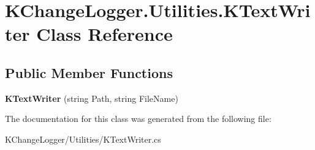 \hypertarget{class_k_change_logger_1_1_utilities_1_1_k_text_writer}{\section{K\-Change\-Logger.\-Utilities.\-K\-Text\-Writer Class Reference}
\label{class_k_change_logger_1_1_utilities_1_1_k_text_writer}
}
\subsection*{Public Member Functions}
\begin{DoxyCompactItemize}
\item 
\hypertarget{class_k_change_logger_1_1_utilities_1_1_k_text_writer_ab3b13c26aa977b5e626b6463cca476e0}{{\bfseries K\-Text\-Writer} (string Path, string File\-Name)}\label{class_k_change_logger_1_1_utilities_1_1_k_text_writer_ab3b13c26aa977b5e626b6463cca476e0}

\end{DoxyCompactItemize}


The documentation for this class was generated from the following file\-:\begin{DoxyCompactItemize}
\item 
K\-Change\-Logger/\-Utilities/K\-Text\-Writer.\-cs\end{DoxyCompactItemize}
